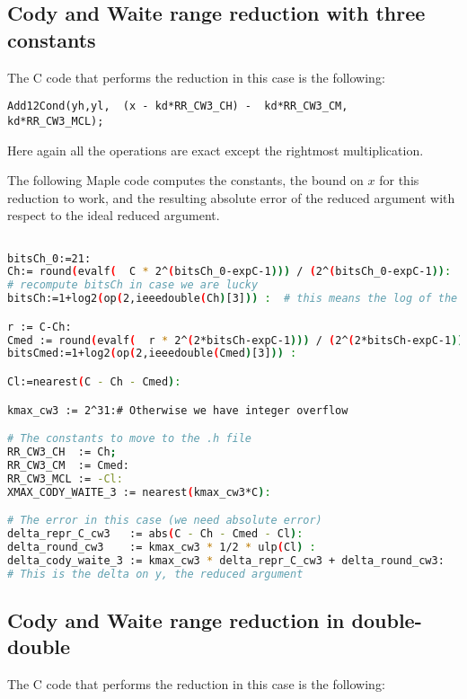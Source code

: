 \subsection{Cody and Waite range reduction with three constants}
The C code that performs the reduction in this case is the following:

\begin{lstlisting}[caption={Cody and Waite range reduction with three 
    constants},firstnumber=35]
	Add12Cond(yh,yl,  (x - kd*RR_CW3_CH) -  kd*RR_CW3_CM,   kd*RR_CW3_MCL);
\end{lstlisting}

Here again all the operations are exact except the rightmost multiplication. 

The following Maple code computes the constants, the bound on $x$ for
this reduction to work, and the resulting absolute error of the reduced
argument with respect to the ideal reduced argument.

\begin{lstlisting}[caption={Maple script for computing constants for
    Cody and Waite 3\label{trigo:lst:cw3maple} },
  language={sh}, numbers=none]% of course it's maple
%Skip a line here, I don't know why, otherwise latex eats the first line

bitsCh_0:=21:
Ch:= round(evalf(  C * 2^(bitsCh_0-expC-1))) / (2^(bitsCh_0-expC-1)):
# recompute bitsCh in case we are lucky
bitsCh:=1+log2(op(2,ieeedouble(Ch)[3])) :  # this means the log of the denominator

r := C-Ch:
Cmed := round(evalf(  r * 2^(2*bitsCh-expC-1))) / (2^(2*bitsCh-expC-1)):
bitsCmed:=1+log2(op(2,ieeedouble(Cmed)[3])) :

Cl:=nearest(C - Ch - Cmed):

kmax_cw3 := 2^31:# Otherwise we have integer overflow

# The constants to move to the .h file
RR_CW3_CH  := Ch;
RR_CW3_CM  := Cmed:
RR_CW3_MCL := -Cl:
XMAX_CODY_WAITE_3 := nearest(kmax_cw3*C):

# The error in this case (we need absolute error)
delta_repr_C_cw3   := abs(C - Ch - Cmed - Cl):
delta_round_cw3    := kmax_cw3 * 1/2 * ulp(Cl) :
delta_cody_waite_3 := kmax_cw3 * delta_repr_C_cw3 + delta_round_cw3:
# This is the delta on y, the reduced argument
\end{lstlisting}

\subsection{Cody and Waite range reduction in double-double\label{trigo:CWDD}}
The C code that performs the reduction in this case is the following:

